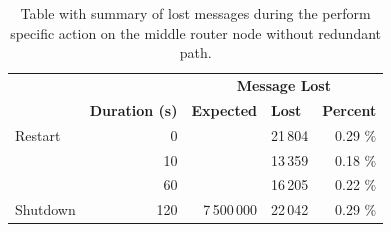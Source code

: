 \begingroup
\setlength{\tabcolsep}{10pt} %
\renewcommand{\arraystretch}{1.35} %
	\begin{table}[H]
	\centering
	\caption{Table with summary of lost messages during the perform specific action on the middle router node without redundant path.}
	\label{tab:agent_redundant_lost}
	\begin{tabular}{|l|r|r|r|r|}
	\hline
	\rowcolor[HTML]{C5E3DF}
	\cellcolor[HTML]{C5E3DF} & \multicolumn{1}{c|}{\cellcolor[HTML]{C5E3DF}} & \multicolumn{3}{c|}{\cellcolor[HTML]{C5E3DF}\textbf{Message Lost}} \\ \cline{3-5}
	\rowcolor[HTML]{C5E3DF}
	\multirow{-2}{*}{\cellcolor[HTML]{C5E3DF}\textbf{Action}} & \multicolumn{1}{c|}{\multirow{-2}{*}{\cellcolor[HTML]{C5E3DF}\textbf{Duration (s)}}} & \multicolumn{1}{l|}{\cellcolor[HTML]{C5E3DF}\textbf{Expected}} & \multicolumn{1}{l|}{\cellcolor[HTML]{C5E3DF}\textbf{Lost}} & \multicolumn{1}{l|}{\cellcolor[HTML]{C5E3DF}\textbf{Percent}} \\ \hline
	Restart & 0 & & 21\,804 & 0.29 \% \\ \cline{1-2} \cline{4-5}
	 & 10 & & 13\,359 & 0.18 \% \\ \cline{2-2} \cline{4-5}
	 & 60 & & 16\,205 & 0.22 \% \\ \cline{2-2} \cline{4-5}
	\multirow{-3}{*}{Shutdown} & 120 & \multirow{-4}{*}{7\,500\,000} & 22\,042 & 0.29 \% \\ \hline
	\end{tabular}
	\end{table}
\endgroup
